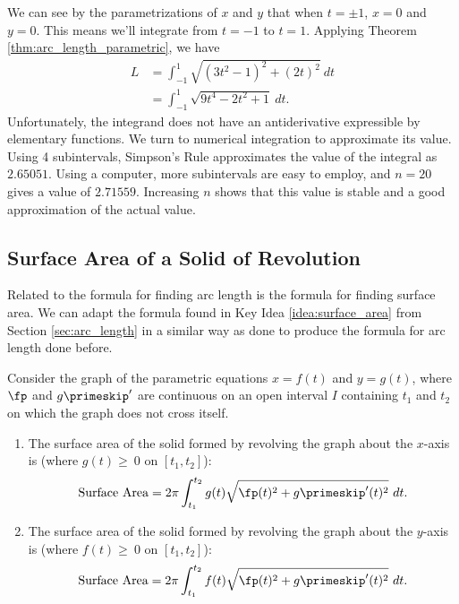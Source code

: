 {We can see by the parametrizations of $x$ and $y$ that when $t=\pm 1$, $x=0$ and $y=0$. This means we'll integrate from $t=-1$ to $t=1$. Applying Theorem \ref{thm:arc_length_parametric}, we have
\begin{align*}
L 	&= \int_{-1}^1\sqrt{(3t^2-1)^2+(2t)^2}\ dt\\
		&=	\int_{-1}^1 \sqrt{9t^4-2t^2+1} \ dt.
\end{align*}
Unfortunately, the integrand does not have an antiderivative expressible by elementary functions. We turn to numerical integration to approximate its value. Using 4 subintervals, Simpson's Rule approximates the value of the integral as $2.65051$. Using a computer, more subintervals are easy to employ, and $n=20$ gives a value of $2.71559$. Increasing $n$ shows that this value is stable and a good approximation of the actual value.
}

\subsection*{Surface Area of a Solid of Revolution}

Related to the formula for finding arc length is the formula for finding surface area. We can adapt the formula found in Key Idea \ref{idea:surface_area} from Section \ref{sec:arc_length} in a similar way as done to produce the formula for arc length done before.

{Consider the graph of the parametric equations $x=f(t)$ and $y=g(t)$, where $\fp$ and $g\primeskip'$ are continuous on an open interval $I$ containing $t_1$ and $t_2$ on which the graph does not cross itself.
\begin{enumerate}
	\item	The surface area of the solid formed by revolving the graph about the $x$-axis is (where $g(t)\geq~0$ on $[t_1,t_2]$):
	$$\text{Surface Area} = 2\pi\int_{t_1}^{t_2} g(t)\sqrt{\fp(t)^2+g\primeskip'(t)^2}\ dt.$$
	
	\item	The surface area of the solid formed by revolving the graph about the $y$-axis is (where $f(t)\geq~0$ on $[t_1,t_2]$):
	$$\text{Surface Area} = 2\pi\int_{t_1}^{t_2} f(t)\sqrt{\fp(t)^2+g\primeskip'(t)^2}\ dt.$$
	\end{enumerate}}

